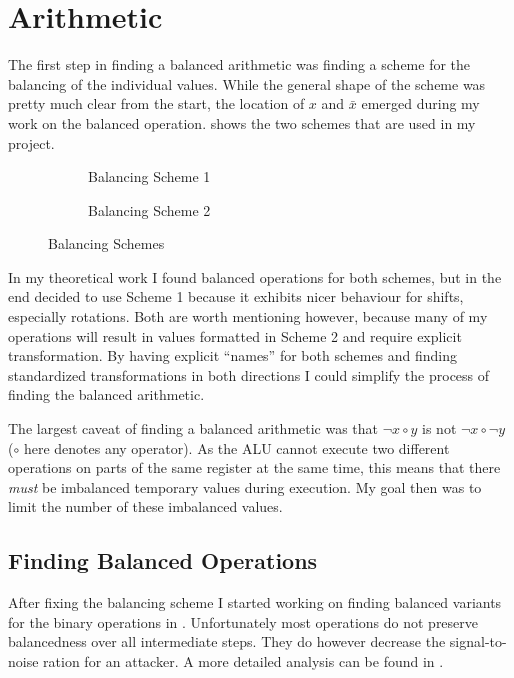 \section{Arithmetic}
\label{arithmetic}
The first step in finding a balanced arithmetic was finding a scheme for the balancing of the individual values.
While the general shape of the scheme was pretty much clear from the start, the location of $x$ and $\bar{x}$ emerged during my work on the balanced operation.
 shows the two schemes that are used in my project.

\begin{figure}[h]
  \centering
  \begin{subfigure}{.49\linewidth}
    \centering
    \caption{Balancing Scheme 1}
    \label{fig:scheme1}
  \end{subfigure}
  \begin{subfigure}{0.49\linewidth}
    \centering
    \caption{Balancing Scheme 2}
  \end{subfigure}
  \caption{Balancing Schemes}
  \label{fig:schemes}
\end{figure}

In my theoretical work I found balanced operations for both schemes, but in the end decided to use Scheme 1 because it exhibits nicer behaviour for shifts, especially rotations.
Both are worth mentioning however, because many of my operations will result in values formatted in Scheme 2 and require explicit transformation.
By having explicit ``names'' for both schemes and finding standardized transformations in both directions I could simplify the process of finding the balanced arithmetic.

The largest caveat of finding a balanced arithmetic was that $\neg{x \circ y}$ is not $\neg{x} \circ \neg{y}$ ($\circ$ here denotes any operator).
As the ALU cannot execute two different operations on parts of the same register at the same time, this means that there \emph{must} be imbalanced temporary values during execution.
My goal then was to limit the number of these imbalanced values.

\subsection{Finding Balanced Operations}
\label{operations}
After fixing the balancing scheme I started working on finding balanced variants for the binary operations in \ir{}.
Unfortunately most operations do not preserve balancedness over all intermediate steps.
They do however decrease the signal-to-noise ration for an attacker.
A more detailed analysis can be found in .

